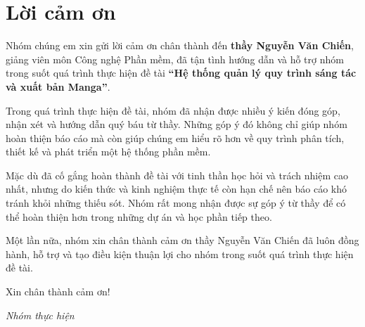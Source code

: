 
\chapter*{Lời cảm ơn}

Nhóm chúng em xin gửi lời cảm ơn chân thành đến \textbf{thầy Nguyễn Văn Chiến}, giảng viên môn Công nghệ Phần mềm, đã tận tình hướng dẫn và hỗ trợ nhóm trong suốt quá trình thực hiện đề tài \textbf{``Hệ thống quản lý quy trình sáng tác và xuất bản Manga''}.

Trong quá trình thực hiện đề tài, nhóm đã nhận được nhiều ý kiến đóng góp, nhận xét và hướng dẫn quý báu từ thầy. Những góp ý đó không chỉ giúp nhóm hoàn thiện báo cáo mà còn giúp chúng em hiểu rõ hơn về quy trình phân tích, thiết kế và phát triển một hệ thống phần mềm.

Mặc dù đã cố gắng hoàn thành đề tài với tinh thần học hỏi và trách nhiệm cao nhất, nhưng do kiến thức và kinh nghiệm thực tế còn hạn chế nên báo cáo khó tránh khỏi những thiếu sót. Nhóm rất mong nhận được sự góp ý từ thầy để có thể hoàn thiện hơn trong những dự án và học phần tiếp theo.

Một lần nữa, nhóm xin chân thành cảm ơn thầy Nguyễn Văn Chiến đã luôn đồng hành, hỗ trợ và tạo điều kiện thuận lợi cho nhóm trong suốt quá trình thực hiện đề tài.

Xin chân thành cảm ơn!

\begin{flushright}
\textit{Nhóm thực hiện}
\end{flushright}

